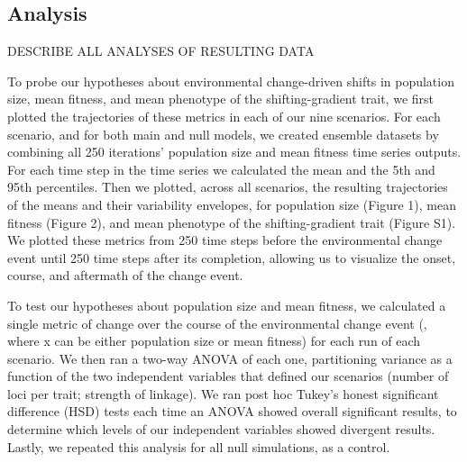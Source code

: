 \documentclass[9pt,twocolumn,twoside,lineno]{pnas-new}
\begin{document}
{\subsection*{Analysis}

DESCRIBE ALL ANALYSES OF RESULTING DATA

To probe our hypotheses about environmental change-driven shifts in population size, 
mean fitness, and mean phenotype of the shifting-gradient trait, we first plotted the 
trajectories of these metrics in each of our nine scenarios. For each scenario, and 
for both main and null models, we created ensemble datasets by combining all 250 
iterations’ population size and mean fitness time series outputs. For each time step 
in the time series we calculated the mean and the 5th and 95th percentiles. Then we 
plotted, across all scenarios, the resulting trajectories of the means and their 
variability envelopes, for population size (Figure 1), mean fitness (Figure 2), and 
mean phenotype of the shifting-gradient trait (Figure S1). We plotted these metrics 
from 250 time steps before the environmental change event until 250 time steps after 
its completion, allowing us to visualize the onset, course, and aftermath of the 
change event. 


To test our hypotheses about population size and mean fitness, we calculated a single 
metric of change over the course of the environmental change event (, where x can be 
either population size or mean fitness) for each run of each scenario. We then ran a 
two-way ANOVA of each one, partitioning variance as a function of the two independent 
variables that defined our scenarios (number of loci per trait; strength of linkage). 
We ran post hoc Tukey’s honest significant difference (HSD) tests each time an ANOVA 
showed overall significant results, to determine which levels of our independent 
variables showed divergent results. Lastly, we repeated this analysis for all null 
simulations, as a control.


}
\end{document}

